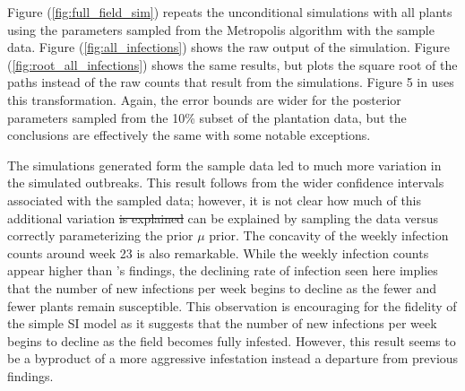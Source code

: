 \documentclass{uwstat572}
\newcommand{\vmdel}[1]{\sout{#1}}
\begin{document}
Figure (\ref{fig:full_field_sim}) repeats the unconditional simulations with all plants using the parameters sampled from the Metropolis algorithm with the sample data. 
Figure (\ref{fig:all_infections}) shows the raw output of the simulation. 
Figure (\ref{fig:root_all_infections}) shows the same results, but plots the square root of the paths instead of the raw counts that result from the simulations. 
Figure 5 in \citet{Brown} uses this transformation. 
Again, the error bounds are wider for the posterior parameters sampled from the 10\% subset of the plantation data, but the conclusions are effectively the same with some notable exceptions. 

The simulations generated form the sample data led to much more variation in the simulated outbreaks. 
This result follows from the wider confidence intervals associated with the sampled data; however, it is not clear how much of this additional variation \vmdel{is explained} can be explained by sampling the data versus correctly parameterizing the prior $\mu$ prior. 
The concavity of the weekly infection counts around week 23 is also remarkable. 
While the weekly infection counts appear higher than \citet{Brown}'s findings, the declining rate of infection seen here implies that the number of new infections per week begins to decline as the fewer and fewer plants remain susceptible. 
This observation is encouraging for the fidelity of the simple SI model as it suggests that the number of new infections per week begins to decline as the field becomes fully infested. 
However, this result seems to be a byproduct of a more aggressive infestation instead a departure from previous findings. 
\end{document}
